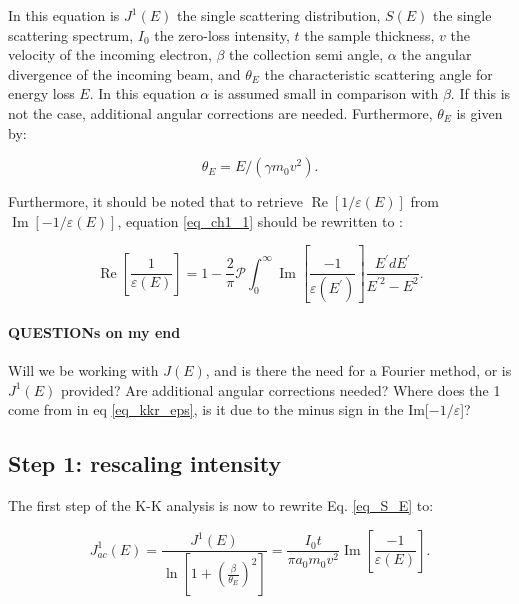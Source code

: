 \documentclass{article}
\begin{document}
In this equation is $J^1(E)$ the single scattering distribution, $S(E)$ the single scattering spectrum, $I_0$ the zero-loss intensity, $t$ the sample thickness, $v$ the velocity of the incoming electron, $\beta$ the collection semi angle, $\alpha$ the angular divergence of the incoming beam, and $\theta_E$ the characteristic scattering angle for energy loss $E$. In this equation $\alpha$ is assumed small in comparison with $\beta$. If this is not the case, additional angular corrections are needed. Furthermore, $\theta_E$ is given by:

\begin{equation} \label{eq_th_E}
    \theta_E = E/(\gamma m_0v^2) .
\end{equation}


Furthermore, it should be noted that to retrieve $\operatorname{Re}\left[1/\varepsilon(E)\right]$ from $\operatorname{Im}\left[-1/\varepsilon(E)\right]$, equation \eqref{eq_ch1_1} should be rewritten to \cite{Dapor2017}:

\begin{equation}\label{eq_kkr_eps}
    \operatorname{Re}\left[\frac{1}{\varepsilon(E)}\right]=1-\frac{2}{\pi} \mathcal{P} \int_{0}^{\infty} \operatorname{Im}\left[\frac{-1}{\varepsilon\left(E^{\prime}\right)}\right] \frac{E^{\prime} d E^{\prime}}{E^{\prime 2}-E^{2}}.
\end{equation}



\paragraph{QUESTIONs on my end} Will we be working with $J(E)$, and is there the need for a Fourier method, or is $J^1(E)$ provided? Are additional angular corrections needed? Where does the 1 come from in eq \eqref{eq_kkr_eps}, is it due to the minus sign in the Im[$-1/\varepsilon$]?

\subsection{Step 1: rescaling intensity}
The first step of the K-K analysis is now to rewrite Eq. \eqref{eq_S_E} to:

\begin{equation}\label{eq_J_ac}
    J^1_{ac}(E) = \frac{J^1(E)}{\ln \left[1+\left(\frac{\beta}{\theta_{E}}\right)^{2}\right]} =\frac{I_{0} t}{\pi a_{0} m_{0} v^{2}}  \operatorname{Im}\left[\frac{-1}{\varepsilon(E)}\right] .
\end{equation}
\end{document}

